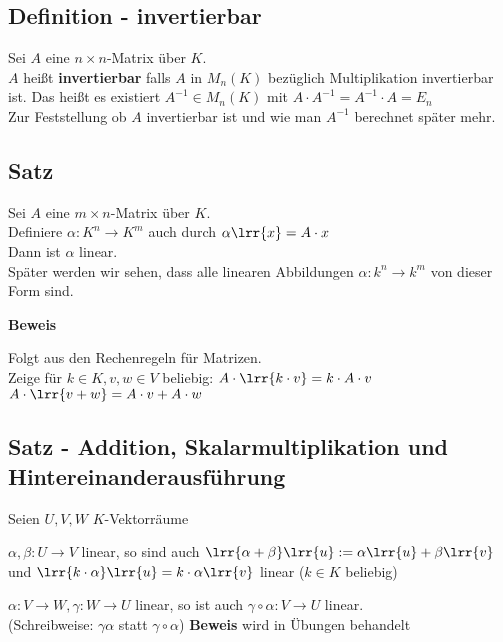 \subsection{Definition - invertierbar}
	Sei $A$ eine $n\times n$-Matrix über $K$.\\
	$A$ heißt \textbf{invertierbar} falls $A$ in $M_n(K)$ bezüglich Multiplikation invertierbar ist. Das heißt es existiert $A^{-1}\in M_n(K)$ mit $A\cdot A^{-1}=A^{-1}\cdot A=E_n$ \\
	Zur Feststellung ob $A$ invertierbar ist und wie man $A^{-1}$ berechnet später mehr.
	
\subsection{Satz}
	Sei $A$ eine $m\times n$-Matrix über $K$.\\
	Definiere $\alpha:K^n\rightarrow K^m$ auch durch $\alpha\lrr{x}=A\cdot x$\\
	Dann ist $\alpha$ linear.\\
	Später werden wir sehen, dass alle linearen Abbildungen $\alpha:k^n\rightarrow k^m$ von dieser Form sind.
	
	\textbf{Beweis}
	
	Folgt aus den Rechenregeln für Matrizen.\\
	Zeige für $k\in K, v,w\in V$ beliebig: $A\cdot\lrr{k\cdot v}=k\cdot A\cdot v$\\
	$A\cdot\lrr{v+w}=A\cdot v+A\cdot w$
	
\subsection{Satz - Addition, Skalarmultiplikation und Hintereinanderausführung}
	Seien $U,V,W$ $K$-Vektorräume
		\item $\alpha,\beta:U\rightarrow V$ linear, so sind auch $\lrr{\alpha+\beta}\lrr{u}:=\alpha\lrr{u}+\beta\lrr{v}$ und $\lrr{k\cdot\alpha}\lrr{u}=k\cdot\alpha\lrr{v}$ linear ($k\in K$ beliebig)
		\item $\alpha:V\rightarrow W,\gamma:W\rightarrow U$ linear, so ist auch $\gamma\circ\alpha:V\rightarrow U$ linear.\\
			(Schreibweise: $\gamma\alpha$ statt $\gamma\circ\alpha$)
	\subExEnd
	\textbf{Beweis} wird in Übungen behandelt
	
